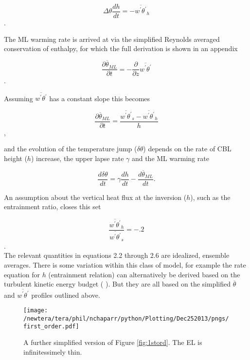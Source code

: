 \begin{equation}
\Delta \theta \frac{dh}{dt} = -\overline{w^{'}\theta^{'}}_{h} 
\end{equation}.  

The \acs{ML} warming rate is arrived at via the simplified Reynolds averaged conservation of enthalpy, for which
the full derivation is shown in an appendix

\begin{equation}
\frac{\partial \overline{\theta}_{ML}}{\partial t} = -\frac{\partial}{\partial z}\overline{w^{'}\theta^{'}}
\end{equation}.

Assuming $\overline{w^{'}\theta^{'}}$ has a constant slope this becomes

\begin{equation}
\frac{\partial \overline{\theta}_{ML}}{\partial t} = \frac{\overline{w^{'}\theta^{'}}_{s}-\overline{w^{'}\theta^{'}}_{h}}{h}
\end{equation},

and the evolution of the temperature jump ($\delta \theta$) depends on the rate of \acs{CBL} height ($h$) increase, 
the upper lapse rate $\gamma$ and the \acs{ML} warming rate
  
\begin{equation}
\frac{d\delta \theta}{dt} = \gamma\frac{dh}{dt} - \frac{d\overline{\theta}_{ML}}{dt}.
\end{equation}

An assumption about the vertical heat flux at the inversion ($h$), such as the entrainment ratio, closes this set

\begin{equation}
\frac{\overline{w^{'}\theta^{'}}_{h}}{\overline{w^{'}\theta^{'}}_{s}} = -.2
\end{equation}.\\

The relevant quantities in equations 2.2 through 2.6 are idealized, ensemble averages. There is some variation within this class of model, for example the rate equation for $h$ (entrainment relation) can alternatively be derived based on the turbulent kinetic energy budget 
(\citeauthor{FedConzMir04} \cite{FedConzMir04}).  But they are all based on the simplified $\overline{\theta}$ and 
$\overline{w^{'}\theta^{'}}$ profiles outlined above.\\  

\begin{figure}[htbp]
    \centering
    \texttt{[image: /newtera/tera/phil/nchaparr/python/Plotting/Dec252013/pngs/first\_order.pdf]}
    \caption{A further simplified version of Figure \ref{fig:1stord}.  The \acs{EL} is infinitessimely thin.}
    \label{fig:1storder}   %
\end{figure}


